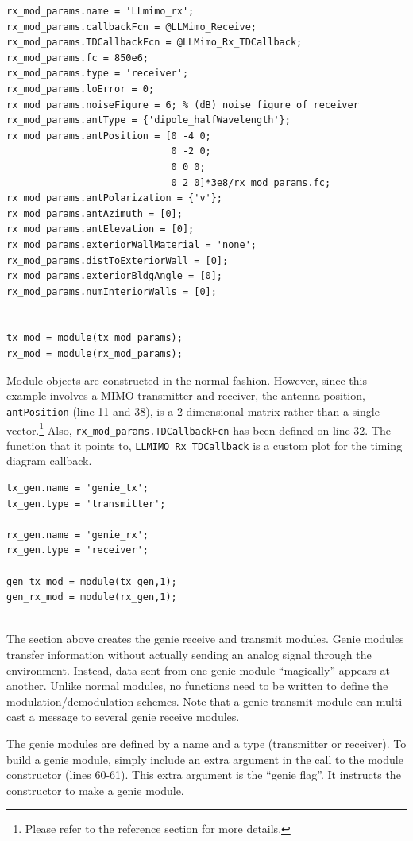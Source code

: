 \begin{lstlisting}[name=llmimoBuild]
rx_mod_params.name = 'LLmimo_rx';
rx_mod_params.callbackFcn = @LLMimo_Receive;
rx_mod_params.TDCallbackFcn = @LLMimo_Rx_TDCallback;
rx_mod_params.fc = 850e6;
rx_mod_params.type = 'receiver';
rx_mod_params.loError = 0;
rx_mod_params.noiseFigure = 6; % (dB) noise figure of receiver
rx_mod_params.antType = {'dipole_halfWavelength'};
rx_mod_params.antPosition = [0 -4 0;
                             0 -2 0;
                             0 0 0;
                             0 2 0]*3e8/rx_mod_params.fc;
rx_mod_params.antPolarization = {'v'};
rx_mod_params.antAzimuth = [0];
rx_mod_params.antElevation = [0];
rx_mod_params.exteriorWallMaterial = 'none';
rx_mod_params.distToExteriorWall = [0];
rx_mod_params.exteriorBldgAngle = [0];
rx_mod_params.numInteriorWalls = [0];


tx_mod = module(tx_mod_params);
rx_mod = module(rx_mod_params);

\end{lstlisting}

Module objects are constructed in the normal fashion.  However,
since this example involves a MIMO transmitter and receiver, the
antenna position, \verb+antPosition+ (line 11 and 38), is a
2-dimensional matrix rather than a single vector.\footnote{Please
refer to the reference section for more details.}  Also,
\verb+rx_mod_params.TDCallbackFcn+ has been defined on line 32.  The
function that it points to, \verb+LLMIMO_Rx_TDCallback+ is a custom
plot for the timing diagram callback.

\begin{lstlisting}[name=llmimoBuild]
% Create genie modules
tx_gen.name = 'genie_tx';
tx_gen.type = 'transmitter';

rx_gen.name = 'genie_rx';
rx_gen.type = 'receiver';

gen_tx_mod = module(tx_gen,1);
gen_rx_mod = module(rx_gen,1);


\end{lstlisting}

The section above creates the genie receive and transmit modules.
Genie modules transfer information without actually sending an
analog signal through the environment.  Instead, data sent from one
genie module ``magically'' appears at another.  Unlike normal
modules, no functions need to be written to define the
modulation/demodulation schemes.  Note that a genie transmit module can multi-cast a message to several genie receive modules.

The genie modules are defined by a name and a type (transmitter or
receiver). To build a genie module, simply include an extra argument
in the call to the module constructor (lines 60-61).  This extra
argument is the ``genie flag''.  It instructs the constructor to
make a genie module.

